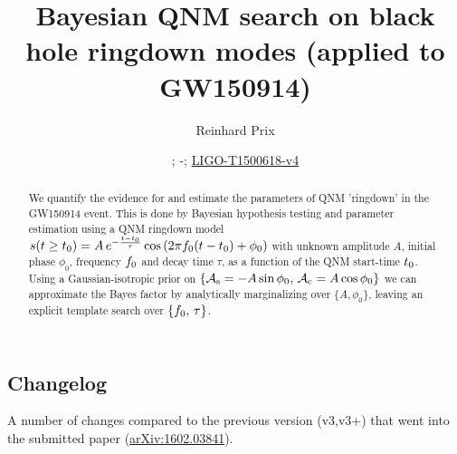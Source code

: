 \documentclass[aps,prd,onecolumn,notitlepage,nofootinbib,superscriptaddress,altaffilletter,floatfix]{revtex4-1}
\newcommand{\dcc}{LIGO-T1500618-v4}
\begin{document}
\title{Bayesian QNM search on black hole ringdown modes (applied to GW150914)}


\author{Reinhard Prix}
\date{\commitDATE; \commitIDshort-\commitSTATUS; \href{https://dcc.ligo.org/LIGO-T1500618}{\dcc}}


\begin{abstract}
  We quantify the evidence for and estimate the parameters of QNM 'ringdown' in the GW150914 event.
  This is done by Bayesian hypothesis testing and parameter estimation using a QNM ringdown model
  $s(t\ge t_0) = A\,e^{-\frac{t-t_0}{\tau}}\cos\left(2\pi f_0 (t-t_0) + \phi_0\right)$ with unknown amplitude $A$, initial phase $\phi_0$,
  frequency $f_0$ and decay time $\tau$, as a function of the QNM start-time $t_0$.
  Using a Gaussian-isotropic prior on $\{{\mathcal A}_{\mathrm{s}}=-A\sin\phi_0,\,{\mathcal A}_{\mathrm{c}}=A\cos\phi_0\}$ we can approximate the Bayes factor by analytically marginalizing over
  $\{A,\phi_0\}$, leaving an explicit template search over $\{f_0,\,\tau\}$.
\end{abstract}

\maketitle

\subsection{Changelog}
\label{sec:changelog}

A number of changes compared to the previous version (v3,v3+) that went into the submitted paper (\href{http://arxiv.org/abs/1602.03841}{arXiv:1602.03841}).
\end{document}
